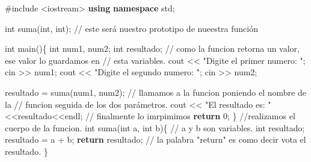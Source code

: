 \documentclass[
  11pt,
  a4paper,
  DIV=11,
  numbers=noendperiod]{scrreprt}
\newenvironment{Shaded}{\begin{snugshade}}{\end{snugshade}}
\newcommand{\CommentTok}[1]{\textcolor[rgb]{0.37,0.37,0.37}{#1}}
\newcommand{\ControlFlowTok}[1]{\textcolor[rgb]{0.00,0.23,0.31}{\textbf{#1}}}
\newcommand{\DataTypeTok}[1]{\textcolor[rgb]{0.68,0.00,0.00}{#1}}
\newcommand{\DecValTok}[1]{\textcolor[rgb]{0.68,0.00,0.00}{#1}}
\newcommand{\ImportTok}[1]{\textcolor[rgb]{0.00,0.46,0.62}{#1}}
\newcommand{\KeywordTok}[1]{\textcolor[rgb]{0.00,0.23,0.31}{\textbf{#1}}}
\newcommand{\NormalTok}[1]{\textcolor[rgb]{0.00,0.23,0.31}{#1}}
\newcommand{\OperatorTok}[1]{\textcolor[rgb]{0.37,0.37,0.37}{#1}}
\newcommand{\PreprocessorTok}[1]{\textcolor[rgb]{0.68,0.00,0.00}{#1}}
\newcommand{\StringTok}[1]{\textcolor[rgb]{0.13,0.47,0.30}{#1}}
\begin{document}
\begin{Shaded}
\begin{Highlighting}[]
\PreprocessorTok{\#include }\ImportTok{\textless{}iostream\textgreater{}}
\KeywordTok{using} \KeywordTok{namespace}\NormalTok{ std}\OperatorTok{;}

\DataTypeTok{int}\NormalTok{ suma}\OperatorTok{(}\DataTypeTok{int}\OperatorTok{,} \DataTypeTok{int}\OperatorTok{);} \CommentTok{// este será nuestro prototipo de nueestra función }

\DataTypeTok{int}\NormalTok{ main}\OperatorTok{()\{}
    \DataTypeTok{int}\NormalTok{ num1}\OperatorTok{,}\NormalTok{ num2}\OperatorTok{;}
    \DataTypeTok{int}\NormalTok{ resultado}\OperatorTok{;} \CommentTok{// como la funcion retorna un valor, ese valor lo guardamos en}
                  \CommentTok{// esta variables.}
\NormalTok{    cout }\OperatorTok{\textless{}\textless{}} \StringTok{"Digite el primer numero: "}\OperatorTok{;}
\NormalTok{    cin }\OperatorTok{\textgreater{}\textgreater{}}\NormalTok{ num1}\OperatorTok{;}
\NormalTok{    cout }\OperatorTok{\textless{}\textless{}} \StringTok{"Digite el segundo numero: "}\OperatorTok{;}
\NormalTok{    cin }\OperatorTok{\textgreater{}\textgreater{}}\NormalTok{ num2}\OperatorTok{;}
    
\NormalTok{    resultado }\OperatorTok{=}\NormalTok{ suma}\OperatorTok{(}\NormalTok{num1}\OperatorTok{,}\NormalTok{ num2}\OperatorTok{);} \CommentTok{// llamamos a la funcion poniendo el nombre de la }
                                  \CommentTok{// funcion seguida de los dos parámetros.}
\NormalTok{    cout }\OperatorTok{\textless{}\textless{}} \StringTok{"El resultado es: "}\OperatorTok{\textless{}\textless{}}\NormalTok{resultado}\OperatorTok{\textless{}\textless{}}\NormalTok{endl}\OperatorTok{;} \CommentTok{// finalmente lo imrpimimos}
    \ControlFlowTok{return} \DecValTok{0}\OperatorTok{;}
\OperatorTok{\}}
\CommentTok{//realizamos el cuerpo de la funcion.}
\DataTypeTok{int}\NormalTok{ suma}\OperatorTok{(}\DataTypeTok{int}\NormalTok{ a}\OperatorTok{,} \DataTypeTok{int}\NormalTok{ b}\OperatorTok{)\{} \CommentTok{// a y b son variables.}
    \DataTypeTok{int}\NormalTok{ resultado}\OperatorTok{;}
\NormalTok{    resultado }\OperatorTok{=}\NormalTok{ a }\OperatorTok{+}\NormalTok{ b}\OperatorTok{;}
    \ControlFlowTok{return}\NormalTok{ resultado}\OperatorTok{;}   \CommentTok{// la palabra "return" es como decir vota el resultado.}
\OperatorTok{\}}
\end{Highlighting}
\end{Shaded}
\end{document}
